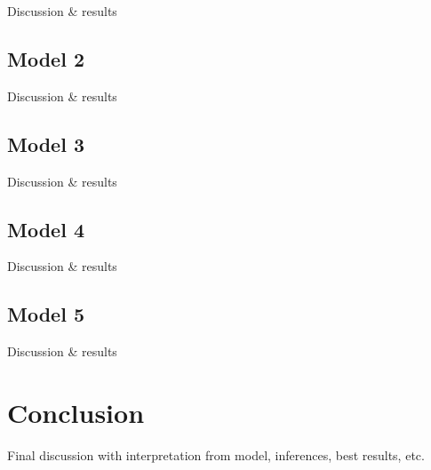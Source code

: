 \documentclass[
  12pt,
]{article}
\begin{document}
Discussion \& results

\hypertarget{model-2}{%
\subsection{Model 2}\label{model-2}}

Discussion \& results

\hypertarget{model-3}{%
\subsection{Model 3}\label{model-3}}

Discussion \& results

\hypertarget{model-4}{%
\subsection{Model 4}\label{model-4}}

Discussion \& results

\hypertarget{model-5}{%
\subsection{Model 5}\label{model-5}}

Discussion \& results

\hypertarget{conclusion}{%
\section{Conclusion}\label{conclusion}}

Final discussion with interpretation from model, inferences, best
results, etc.
\end{document}
